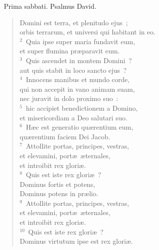 ~\lettrine[lines=10,image=true,loversize=0.05,lraise=-0.03]{P}{}rima sabbati. Psalmus David. \begin{flushleft}\begin{verse}\vspace{6pt}Domini est terra, et plenitudo ejus~;\\ orbis terrarum, et universi qui habitant in eo.\\
${}^{2}$~Quia ipse super maria fundavit eum,\\ et super flumina pr\ae paravit eum.\\
${}^{3}$~Quis ascendet in montem Domini~?\\ aut quis stabit in loco sancto ejus~?\\
${}^{4}$~Innocens manibus et mundo corde,\\ qui non accepit in vano animam suam,\\ nec juravit in dolo proximo suo~:\\
${}^{5}$~hic accipiet benedictionem a Domino,\\ et misericordiam a Deo salutari suo.\\
${}^{6}$~H\ae c est generatio qu\ae rentium eum,\\ qu\ae rentium faciem Dei Jacob.\\
${}^{7}$~Attollite portas, principes, vestras,\\ et elevamini, port\ae\ \ae ternales,\\ et introibit rex glori\ae .\\
${}^{8}$~Quis est iste rex glori\ae~?\\ Dominus fortis et potens,\\ Dominus potens in pr\ae lio.\\
${}^{9}$~Attollite portas, principes, vestras,\\ et elevamini, port\ae\ \ae ternales,\\ et introibit rex glori\ae .\\
${}^{10}$~Quis est iste rex glori\ae~?\\ Dominus virtutum ipse est rex glori\ae .\end{verse}\end{flushleft}


